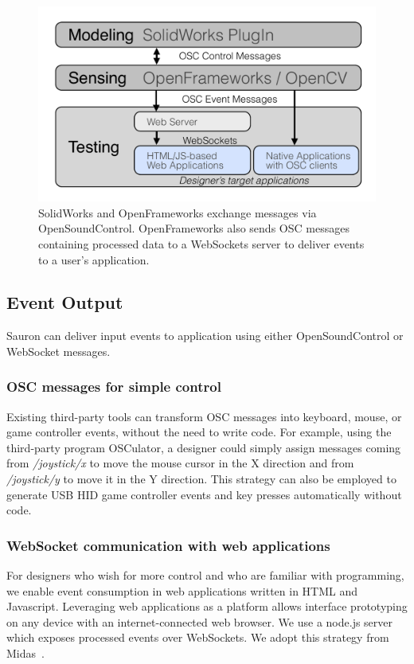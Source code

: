 \begin{figure}
\centering
\includegraphics[width=\textwidth]{figures/sauron/arch2outlined.pdf}
\caption{SolidWorks and OpenFrameworks exchange messages via OpenSoundControl. OpenFrameworks also sends OSC messages containing processed data to a WebSockets server to deliver events to a user's application.}
\label{fig:sauron-arch}
\end{figure}

\subsection{Event Output}
Sauron can deliver input events to application using either OpenSoundControl or WebSocket messages.

\subsubsection{OSC messages for simple control}

Existing third-party tools can transform OSC messages into keyboard, mouse, or game controller events, without the need to write code. For example, using the third-party program OSCulator, a designer could simply assign messages coming from {\em /joystick/x} to move the mouse cursor in the X direction and from {\em /joystick/y} to move it in the Y direction. This strategy can also be employed to generate USB HID game controller events and key presses automatically without code.

\subsubsection{WebSocket communication with web applications}

For designers who wish for more control and who are familiar with programming, we enable event consumption in web applications written in HTML and Javascript. Leveraging web applications as a platform allows interface prototyping on any device with an internet-connected web browser. 
We use a node.js server which exposes processed events over WebSockets. We adopt this strategy from Midas~\cite{savage-midas}. 

